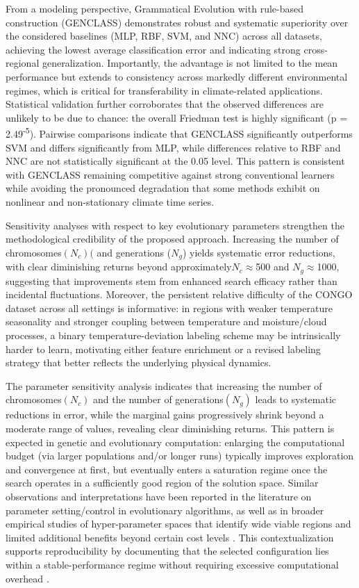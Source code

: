 \documentclass[12pt]{Definitions/academia}
\begin{document}
From a modeling perspective, Grammatical Evolution with rule-based
construction (GENCLASS) demonstrates robust and systematic superiority
over the considered baselines (MLP, RBF, SVM, and NNC) across all
datasets, achieving the lowest average classification error and indicating
strong cross-regional generalization. Importantly, the advantage is
not limited to the mean performance but extends to consistency across
markedly different environmental regimes, which is critical for transferability
in climate-related applications. Statistical validation further corroborates
that the observed differences are unlikely to be due to chance: the
overall Friedman test is highly significant (p = 2.49\textsuperscript{-}\textsuperscript{5}).
Pairwise comparisons indicate that GENCLASS significantly outperforms
SVM and differs significantly from MLP, while differences relative
to RBF and NNC are not statistically significant at the 0.05 level.
This pattern is consistent with GENCLASS remaining competitive against
strong conventional learners while avoiding the pronounced degradation
that some methods exhibit on nonlinear and non-stationary climate
time series.

Sensitivity analyses with respect to key evolutionary parameters strengthen
the methodological credibility of the proposed approach. Increasing
the number of chromosomes$(N_{c})($ and generations ($N_{g}$) yields
systematic error reductions, with clear diminishing returns beyond
approximately$N_{c}$\ensuremath{\approx}500 and $N_{g}$\ensuremath{\approx}1000,
suggesting that improvements stem from enhanced search efficacy rather
than incidental fluctuations. Moreover, the persistent relative difficulty
of the CONGO dataset across all settings is informative: in regions
with weaker temperature seasonality and stronger coupling between
temperature and moisture/cloud processes, a binary temperature-deviation
labeling scheme may be intrinsically harder to learn, motivating either
feature enrichment or a revised labeling strategy that better reflects
the underlying physical dynamics.

The parameter sensitivity analysis indicates that increasing the number
of chromosomes$(N_{c})$ and the number of generations$(N_{g})$ leads
to systematic reductions in error, while the marginal gains progressively
shrink beyond a moderate range of values, revealing clear diminishing
returns. This pattern is expected in genetic and evolutionary computation:
enlarging the computational budget (via larger populations and/or
longer runs) typically improves exploration and convergence at first,
but eventually enters a saturation regime once the search operates
in a sufficiently good region of the solution space. Similar observations
and interpretations have been reported in the literature on parameter
setting/control in evolutionary algorithms, as well as in broader
empirical studies of hyper-parameter spaces that identify wide viable
regions and limited additional benefits beyond certain cost levels
\textit{\cite{Eiben 1999,De Jong 2007,Sipper 2018,O=002019Neill 2018}}.
This contextualization supports reproducibility by documenting that
the selected configuration lies within a stable-performance regime
without requiring excessive computational overhead \textit{\cite{Mills 2014}.}
\end{document}
